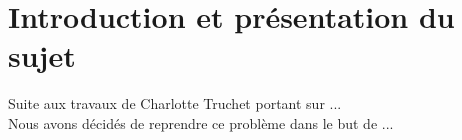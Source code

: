 \section{Introduction et présentation du sujet}

Suite aux travaux de Charlotte Truchet \cite{CTThese} portant sur ...\\
Nous avons décidés de reprendre ce problème dans le but de ...

